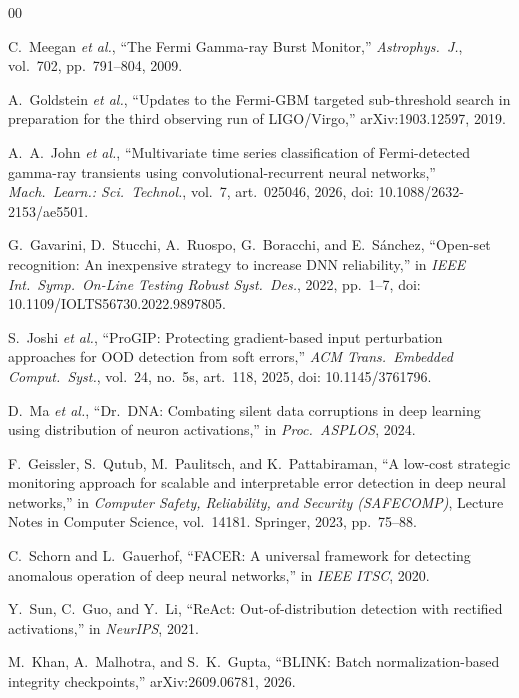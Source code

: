 \documentclass{ieeeaccess}
\begin{document}
\begin{thebibliography}{00}

C.~Meegan \textit{et al.}, ``The Fermi Gamma-ray Burst Monitor,'' \textit{Astrophys.\ J.}, vol.~702, pp.~791--804, 2009.

A.~Goldstein \textit{et al.}, ``Updates to the Fermi-GBM targeted sub-threshold search in preparation for the third observing run of LIGO/Virgo,'' arXiv:1903.12597, 2019.

A.~A.~John \textit{et al.}, ``Multivariate time series classification of Fermi-detected gamma-ray transients using convolutional-recurrent neural networks,'' \textit{Mach.\ Learn.: Sci.\ Technol.}, vol.~7, art.~025046, 2026, doi: 10.1088/2632-2153/ae5501.

G.~Gavarini, D.~Stucchi, A.~Ruospo, G.~Boracchi, and E.~S\'{a}nchez, ``Open-set recognition: An inexpensive strategy to increase DNN reliability,'' in \textit{IEEE Int.\ Symp.\ On-Line Testing Robust Syst.\ Des.}, 2022, pp.~1--7, doi: 10.1109/IOLTS56730.2022.9897805.

S.~Joshi \textit{et al.}, ``ProGIP: Protecting gradient-based input perturbation approaches for OOD detection from soft errors,'' \textit{ACM Trans.\ Embedded Comput.\ Syst.}, vol.~24, no.~5s, art.~118, 2025, doi: 10.1145/3761796.

D.~Ma \textit{et al.}, ``Dr.\ DNA: Combating silent data corruptions in deep learning using distribution of neuron activations,'' in \textit{Proc.\ ASPLOS}, 2024.

F.~Geissler, S.~Qutub, M.~Paulitsch, and K.~Pattabiraman, ``A low-cost strategic monitoring approach for scalable and interpretable error detection in deep neural networks,'' in \textit{Computer Safety, Reliability, and Security (SAFECOMP)}, Lecture Notes in Computer Science, vol.~14181. Springer, 2023, pp.~75--88.

C.~Schorn and L.~Gauerhof, ``FACER: A universal framework for detecting anomalous operation of deep neural networks,'' in \textit{IEEE ITSC}, 2020.

Y.~Sun, C.~Guo, and Y.~Li, ``ReAct: Out-of-distribution detection with rectified activations,'' in \textit{NeurIPS}, 2021.

M.~Khan, A.~Malhotra, and S.~K.\ Gupta, ``BLINK: Batch normalization-based integrity checkpoints,'' arXiv:2609.06781, 2026.


\end{thebibliography}
\end{document}
